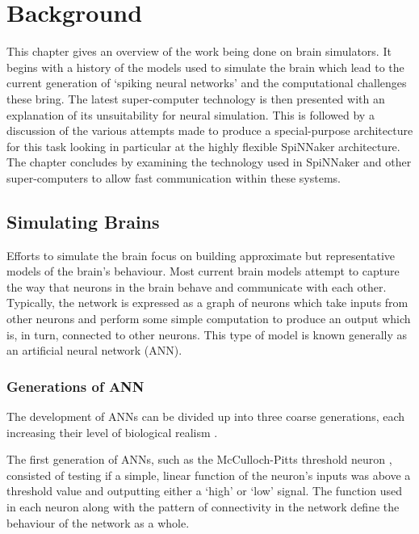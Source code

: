 \chapter{Background}
	\label{chap:background}
	
	This chapter gives an overview of the work being done on brain simulators. It
	begins with a history of the models used to simulate the brain which lead to
	the current generation of `spiking neural networks' and the computational
	challenges these bring. The latest super-computer technology is then presented
	with an explanation of its unsuitability for neural simulation. This is
	followed by a discussion of the various attempts made to produce a
	special-purpose architecture for this task looking in particular at the highly
	flexible SpiNNaker architecture. The chapter concludes by examining the
	technology used in SpiNNaker and other super-computers to allow fast
	communication within these systems.
	
	\section{Simulating Brains}
		
		\label{sec:simulating-brains}
		
		
		Efforts to simulate the brain focus on building approximate but
		representative models of the brain's behaviour. Most current brain models
		attempt to capture the way that neurons in the brain behave and communicate
		with each other. Typically, the network is expressed as a graph of neurons
		which take inputs from other neurons and perform some simple computation to
		produce an output which is, in turn, connected to other neurons. This type
		of model is known generally as an artificial neural network (ANN).
		
		\subsection{Generations of ANN}
			
			The development of ANNs can be divided up into three coarse generations,
			each increasing their level of biological realism \cite{vainbrand11}.
			
			The first generation of ANNs, such as the McCulloch-Pitts threshold neuron
			\cite{mcculloch43}, consisted of testing if a simple, linear function of
			the neuron's inputs was above a threshold value and outputting either a
			`high' or `low' signal. The function used in each neuron along with the
			pattern of connectivity in the network define the behaviour of the network
			as a whole.
			
